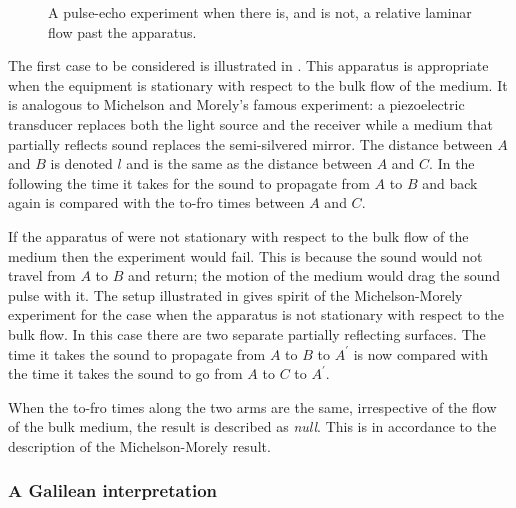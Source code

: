  \begin{figure}[t]
      \centering
\hspace{2cm}
\label{fig:setups}
      \caption{A pulse-echo experiment when there is, and is not, a relative laminar flow past the apparatus.}
 \end{figure}
The first case to be considered is illustrated in .
This apparatus is appropriate when the equipment is stationary with respect to the bulk flow of the medium.
It is  analogous to  Michelson and Morely's famous experiment:
a piezoelectric transducer  replaces both the light source and the receiver while a medium that partially reflects sound  replaces the semi-silvered mirror.
The distance between $A$ and $B$ is denoted $l$ and is the same  as the distance between $A$ and $C$.
In the following the time it takes for the sound to propagate from $A$ to $B$ and back again is compared with the to-fro times between $A$ and $C$.


If the apparatus of  were not stationary with respect to the bulk flow of the medium then the experiment would fail.
This is because the sound would not travel from  $A$ to $B$ and return;
the motion of the medium would drag the sound pulse with it.
The setup illustrated in  gives spirit of the Michelson-Morely experiment for the case when the apparatus is not stationary with respect to the bulk flow.
In this case there are two separate partially reflecting surfaces.
The time it takes the sound to propagate from $A$ to $B$ to $A^\prime$ is now compared with the time it takes the sound 
to go from $A$ to $C$ to $A^\prime$.

When the to-fro times along the two arms are the same, irrespective of the flow  of the bulk medium,  the result is described as {\em null}.
This is in accordance to the description of the Michelson-Morely result.

\subsubsection{A Galilean interpretation}\label{sec:MMGalilean}

